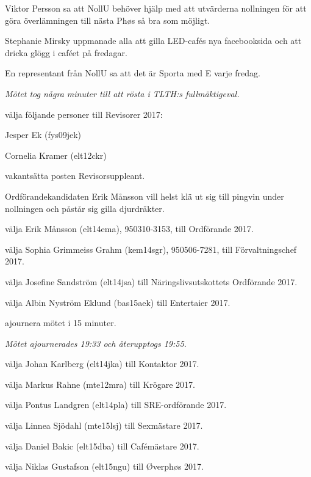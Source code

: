 \documentclass[10pt]{article}
\begin{document}
\begin{paragrafer}
Viktor Persson sa att NollU behöver hjälp med att utvärderna nollningen för att göra överlämningen till nästa Phøs så bra som möjligt.

Stephanie Mirsky uppmanade alla att gilla LED-cafés nya facebooksida och att dricka glögg i caféet på fredagar.

En representant från NollU sa att det är Sporta med E varje fredag.

\emph{Mötet tog några minuter till att rösta i TLTH:s fullmäktigeval.}

\begin{paralist}
    \Mba välja följande personer till Revisorer 2017:
    \begin{tightdashlist}
        \item Jesper Ek (fys09jek)
        \item Cornelia Kramer (elt12ckr)
    \end{tightdashlist}

    \Mba vakantsätta posten Revisorsuppleant.

    Ordförandekandidaten Erik Månsson vill helst klä ut sig till pingvin under nollningen och påstår sig gilla djurdräkter.

    \Mba välja Erik Månsson (elt14ema), 950310-3153, till Ordförande 2017.

    \Mba välja Sophia Grimmeiss Grahm (kem14sgr), 950506-7281, till Förvaltningschef 2017.

    \Mba välja Josefine Sandström (elt14jsa) till Näringslivsutskottets Ordförande 2017.

    \Mba välja Albin Nyström Eklund (bas15aek) till Entertaier 2017.

    \Mba ajournera mötet i 15 minuter.

    \emph{Mötet ajournerades 19:33 och återupptogs 19:55.}

    \Mba välja Johan Karlberg (elt14jka) till Kontaktor 2017.

    \Mba välja Markus Rahne (mte12mra) till Krögare 2017.

    \Mba välja Pontus Landgren (elt14pla) till SRE-ordförande 2017.

    \Mba välja Linnea Sjödahl (mte15lsj) till Sexmästare 2017.

    \Mba välja Daniel Bakic (elt15dba) till Cafémästare 2017.

    \Mba välja Niklas Gustafson (elt15ngu) till Øverphøs 2017.


\end{paralist}
\end{paragrafer}
\end{document}
